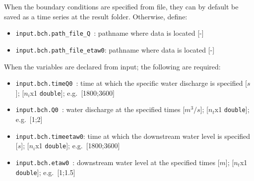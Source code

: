 \documentclass[a4paper, 11pt]{article}
\begin{document}
When the boundary conditions are specified from file, they can by default be saved as a time series at the result folder. Otherwise, define:
\begin{itemize}
\item \texttt{input.bch.path\_file\_Q  }: pathname where data is located [-] 
\item \texttt{input.bch.path\_file\_etaw0}: pathname where data is located [-]\\
\end{itemize}
When the variables are declared from input; the following are required:
\begin{itemize}
\item \texttt{input.bch.timeQ0   }: time at which the specific water discharge is specified [$s$]; [$n_i$x1 \texttt{double}]; e.g.\ [1800;3600]
\item \texttt{input.bch.Q0       }: water discharge at the specified times [$m^3/s$]; [$n_t$x1 \texttt{double}]; e.g.\ [1;2]
\item \texttt{input.bch.timeetaw0}: time at which the downstream water level is specified [$s$]; [$n_i$x1 \texttt{double}]; e.g.\ [1800;3600]
\item \texttt{input.bch.etaw0    }: downstream water level at the specified times [$m$]; [$n_t$x1 \texttt{double}]; e.g.\ [1;1.5]
\end{itemize}

%
\end{document}
